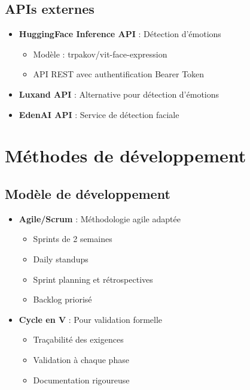 \documentclass[a4paper,11pt]{report}
\begin{document}
\subsection{APIs externes}

\begin{itemize}
    \item \textbf{HuggingFace Inference API} : Détection d'émotions
    \begin{itemize}
        \item Modèle : trpakov/vit-face-expression
        \item API REST avec authentification Bearer Token
    \end{itemize}
    
    \item \textbf{Luxand API} : Alternative pour détection d'émotions
    \item \textbf{EdenAI API} : Service de détection faciale
\end{itemize}

\section{Méthodes de développement}

\subsection{Modèle de développement}

\begin{itemize}
    \item \textbf{Agile/Scrum} : Méthodologie agile adaptée
    \begin{itemize}
        \item Sprints de 2 semaines
        \item Daily standups
        \item Sprint planning et rétrospectives
        \item Backlog priorisé
    \end{itemize}
    
    \item \textbf{Cycle en V} : Pour validation formelle
    \begin{itemize}
        \item Traçabilité des exigences
        \item Validation à chaque phase
        \item Documentation rigoureuse
    \end{itemize}
\end{itemize}
\end{document}
